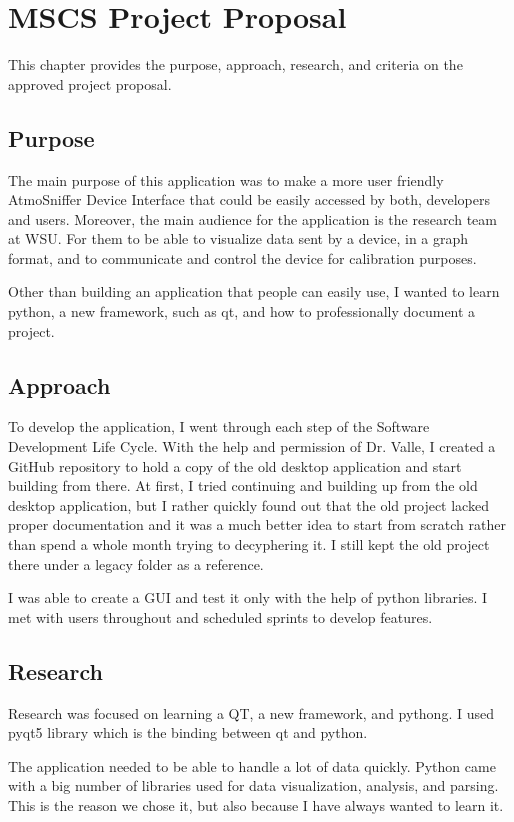 \chapter{MSCS Project Proposal} %
This chapter provides the purpose, approach, research, and criteria on the approved project proposal.
\section{Purpose}
The main purpose of this application was to make a more user friendly AtmoSniffer Device Interface that could be easily accessed by both, developers and users.
Moreover, the main audience for the application is the research team at WSU. For them to be able to visualize data sent by a device, in a graph format, and to communicate and control the device for calibration purposes.

Other than building an application that people can easily use, I wanted to learn python, a new framework, such as qt, and how to professionally document a project.

\section{Approach}
To develop the application, I went through each step of the Software Development Life Cycle. With the help and permission of Dr. Valle, I created a GitHub repository to hold a copy of the old desktop application and start building from there. At first, I tried continuing and building up from the old desktop application, but I rather quickly found out that the old project lacked proper documentation and it was a much better idea to start from scratch rather than spend a whole month trying to decyphering it. I still kept the old project there under a legacy folder as a reference.

I was able to create a GUI and test it only with the help of python libraries. I met with users throughout and scheduled sprints to develop features.
\section{Research}
Research was focused on learning a QT, a new framework, and pythong. I used pyqt5 library which is the binding between qt and python.

The application needed to be able to handle a lot of data quickly. Python came with a big number of libraries used for data visualization, analysis, and parsing. This is the reason we chose it, but also because I have always wanted to learn it.


